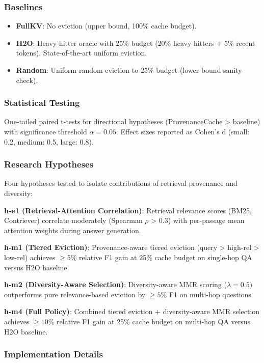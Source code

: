 \subsubsection{Baselines}

\begin{itemize}
\item \textbf{FullKV}: No eviction (upper bound, 100\% cache budget).
\item \textbf{H2O}: Heavy-hitter oracle with 25\% budget (20\% heavy hitters + 5\% recent tokens). State-of-the-art uniform eviction.
\item \textbf{Random}: Uniform random eviction to 25\% budget (lower bound sanity check).
\end{itemize}

\subsubsection{Statistical Testing}

One-tailed paired t-tests for directional hypotheses (ProvenanceCache > baseline) with significance threshold $\alpha =0.05$. Effect sizes reported as Cohen's d (small: 0.2, medium: 0.5, large: 0.8).

\subsubsection{Research Hypotheses}

Four hypotheses tested to isolate contributions of retrieval provenance and diversity:

\textbf{h-e1 (Retrieval-Attention Correlation)}: Retrieval relevance scores (BM25, Contriever) correlate moderately (Spearman $\rho$ > 0.3) with per-passage mean attention weights during answer generation.

\textbf{h-m1 (Tiered Eviction)}: Provenance-aware tiered eviction (query > high-rel > low-rel) achieves $\geq 5$\% relative F1 gain at 25\% cache budget on single-hop QA versus H2O baseline.

\textbf{h-m2 (Diversity-Aware Selection)}: Diversity-aware MMR scoring ($\lambda =0.5)$ outperforms pure relevance-based eviction by $\geq 5$\% F1 on multi-hop questions.

\textbf{h-m4 (Full Policy)}: Combined tiered eviction + diversity-aware MMR selection achieves $\geq 10$\% relative F1 gain at 25\% cache budget on multi-hop QA versus H2O baseline.

\subsubsection{Implementation Details}

